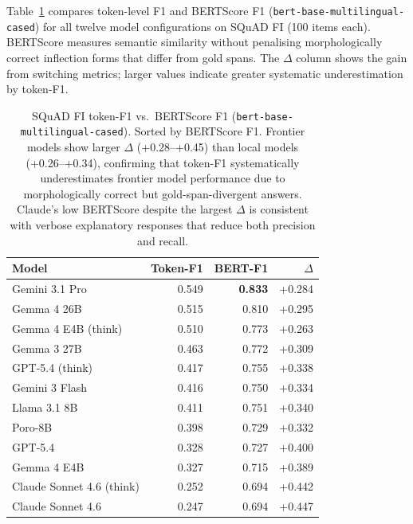 \documentclass[11pt]{article}
\begin{document}
Table~\ref{tab:bertscore} compares token-level F1 and BERTScore F1
(\texttt{bert-base-multilingual-cased}) for all twelve model configurations
on SQuAD FI (100 items each).
BERTScore measures semantic similarity without penalising morphologically
correct inflection forms that differ from gold spans.
The $\Delta$ column shows the gain from switching metrics; larger values
indicate greater systematic underestimation by token-F1.

\begin{table}[h]
\centering
\small
\begin{tabular}{lrrr}
\toprule
\textbf{Model} & \textbf{Token-F1} & \textbf{BERT-F1} & \textbf{$\Delta$} \\
\midrule
Gemini 3.1 Pro               & 0.549 & \textbf{0.833} & +0.284 \\
Gemma 4 26B                  & 0.515 & 0.810 & +0.295 \\
Gemma 4 E4B (think)          & 0.510 & 0.773 & +0.263 \\
Gemma 3 27B                  & 0.463 & 0.772 & +0.309 \\
GPT-5.4 (think)              & 0.417 & 0.755 & +0.338 \\
Gemini 3 Flash               & 0.416 & 0.750 & +0.334 \\
Llama 3.1 8B                 & 0.411 & 0.751 & +0.340 \\
Poro-8B                      & 0.398 & 0.729 & +0.332 \\
GPT-5.4                      & 0.328 & 0.727 & +0.400 \\
Gemma 4 E4B                  & 0.327 & 0.715 & +0.389 \\
Claude Sonnet 4.6 (think)    & 0.252 & 0.694 & +0.442 \\
Claude Sonnet 4.6            & 0.247 & 0.694 & +0.447 \\
\bottomrule
\end{tabular}
\caption{SQuAD FI token-F1 vs.\ BERTScore F1 (\texttt{bert-base-multilingual-cased}).
  Sorted by BERTScore F1.
  Frontier models show larger $\Delta$ (+0.28--+0.45) than local models
  (+0.26--+0.34), confirming that token-F1 systematically underestimates
  frontier model performance due to morphologically correct but
  gold-span-divergent answers.
  Claude's low BERTScore despite the largest $\Delta$ is consistent with
  verbose explanatory responses that reduce both precision and recall.}
\label{tab:bertscore}
\end{table}

\clearpage
\end{document}
